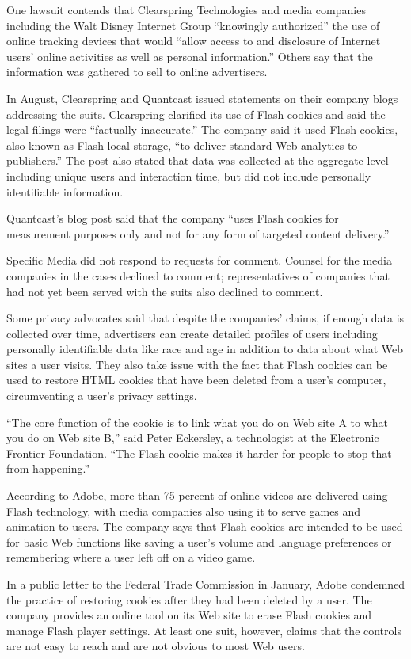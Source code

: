 ﻿\documentclass[12pt]{article}
\begin{document}
One lawsuit contends that Clearspring Technologies and media companies including the Walt Disney
Internet Group ``knowingly authorized'' the use of online tracking devices that would ``allow access
to and disclosure of Internet users' online activities as well as personal information.'' Others say
that the information was gathered to sell to online advertisers.

In August, Clearspring and Quantcast issued statements on their company blogs addressing the suits.
Clearspring clarified its use of Flash cookies and said the legal filings were ``factually
inaccurate.'' The company said it used Flash cookies, also known as Flash local storage, ``to
deliver standard Web analytics to publishers.'' The post also stated that data was collected at the
aggregate level including unique users and interaction time, but did not include personally
identifiable information.

Quantcast's blog post said that the company ``uses Flash cookies for measurement purposes only and
not for any form of targeted content delivery.''

Specific Media did not respond to requests for comment. Counsel for the media companies in the cases
declined to comment; representatives of companies that had not yet been served with the suits also
declined to comment.

Some privacy advocates said that despite the companies' claims, if enough data is collected over
time, advertisers can create detailed profiles of users including personally identifiable data like
race and age in addition to data about what Web sites a user visits. They also take issue with the
fact that Flash cookies can be used to restore HTML cookies that have been deleted from a user's
computer, circumventing a user's privacy settings.

``The core function of the cookie is to link what you do on Web site A to what you do on Web site
B,'' said Peter Eckersley, a technologist at the Electronic Frontier Foundation. ``The Flash cookie
makes it harder for people to stop that from happening.''

According to Adobe, more than 75 percent of online videos are delivered using Flash technology, with
media companies also using it to serve games and animation to users. The company says that Flash
cookies are intended to be used for basic Web functions like saving a user's volume and language
preferences or remembering where a user left off on a video game.

In a public letter to the Federal Trade Commission in January, Adobe condemned the practice of
restoring cookies after they had been deleted by a user. The company provides an online tool on its
Web site to erase Flash cookies and manage Flash player settings. At least one suit, however, claims
that the controls are not easy to reach and are not obvious to most Web users.
\end{document}
